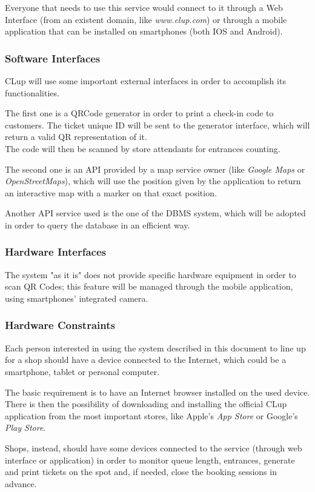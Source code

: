 \documentclass[table, 12pt]{article}
\begin{document}
\begin{flushleft}
    Everyone that needs to use this service would connect to it through a Web Interface (from an existent domain, like \textit{www.clup.com}) or through a mobile application that can be installed on smartphones (both IOS and Android).

    \subsubsection{Software Interfaces}
    CLup will use some important external interfaces in order to accomplish its functionalities.

    The first one is a QRCode generator in order to print a check-in code to customers.
    The ticket unique ID will be sent to the generator interface, which will return a valid QR representation of it.\\
    The code will then be scanned by store attendants for entrances counting.

    The second one is an API provided by a map service owner (like \textit{Google Maps} or \textit{OpenStreetMaps}), which will use the position given by the application to return an interactive map with a marker on that exact position.

    Another API service used is the one of the DBMS system, which will be adopted in order to query the database in an efficient way.
    \subsubsection{Hardware Interfaces}
    The system "as it is" does not provide specific hardware equipment in order to scan QR Codes; this feature will be managed through the mobile application, using smartphones' integrated camera.
    \subsubsection{Hardware Constraints}
    Each person interested in using the system described in this document to line up for a shop should have a device connected to the Internet, which could be a smartphone, tablet or personal computer.

    The basic requirement is to have an Internet browser installed on the used device.
    There is then the possibility of downloading and installing the official CLup application from the most important stores, like Apple's \textit{App Store} or Google's \textit{Play Store}.

    Shops, instead, should have some devices connected to the service (through web interface or application) in order to monitor queue length, entrances, generate and print tickets on the spot and, if needed, close the booking sessions in advance.


\end{flushleft}
\end{document}
